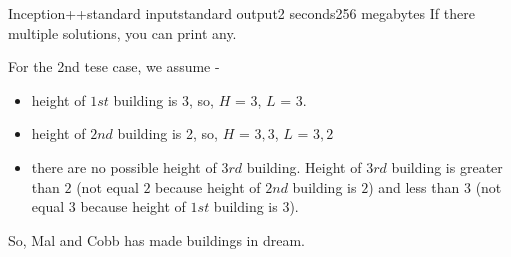 \begin{problem}{Inception++}{standard input}{standard output}{2 seconds}{256 megabytes}
If there multiple solutions, you can print any.

\Example

\begin{example}
%
\end{example}

\Note
For the 2nd tese case, we assume - 
\begin{itemize}
\item height of $1st$ building is 3, so, $H$ = ${3}$, $L$ = ${3}$.
\item height of $2nd$ building is 2, so, $H$ = ${3, 3}$, $L$ = ${3, 2}$
\item there are no possible height of $3rd$ building. Height of $3rd$ building is greater than $2$ (not equal $2$ because height of $2nd$ building is $2$) and less than $3$ (not equal $3$ because height of $1st$ building is $3$).
\end{itemize}
So, Mal and Cobb has made buildings in dream.

\end{problem}

